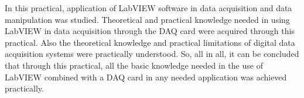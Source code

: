 In this practical, application of LabVIEW  software in data acquisition and data manipulation was studied. Theoretical and practical knowledge needed in using LabVIEW in data acquisition through the DAQ card were acquired through this practical. Also the theoretical knowledge and practical
limitations of digital data acquisition systems were practically understood. So, all in all, it can be concluded
that through this practical, all the basic knowledge needed in the use of LabVIEW combined with a DAQ card in any needed application was achieved practically.